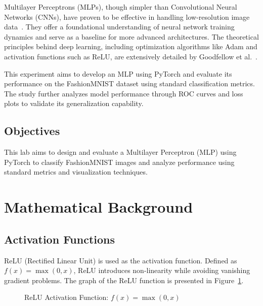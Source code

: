 \documentclass[a4paper, journal]{IEEEtran}
\begin{document}
Multilayer Perceptrons (MLPs), though simpler than Convolutional Neural Networks (CNNs), have proven to be effective in handling low-resolution image data~\cite{gu2018recent}. They offer a foundational understanding of neural network training dynamics and serve as a baseline for more advanced architectures. The theoretical principles behind deep learning, including optimization algorithms like Adam and activation functions such as ReLU, are extensively detailed by Goodfellow et al.~\cite{goodfellow2016deep}.

This experiment aims to develop an MLP using PyTorch and evaluate its performance on the FashionMNIST dataset using standard classification metrics. The study further analyzes model performance through ROC curves and loss plots to validate its generalization capability.


\subsection{Objectives}
This lab aims to design and evaluate a Multilayer Perceptron (MLP) using PyTorch to classify FashionMNIST images and analyze performance using standard metrics and visualization techniques.

\section{Mathematical Background}
\subsection{Activation Functions}
ReLU (Rectified Linear Unit) is used as the activation function. Defined as \( f(x) = \max(0, x) \), ReLU introduces non-linearity while avoiding vanishing gradient problems. The graph of the ReLU function is presented in Figure~\ref{fig:relu}.
\begin{figure}[h]
    \centering
    \caption{ReLU Activation Function: $f(x) = \max(0, x)$}
    \label{fig:relu}
\end{figure}
\end{document}
